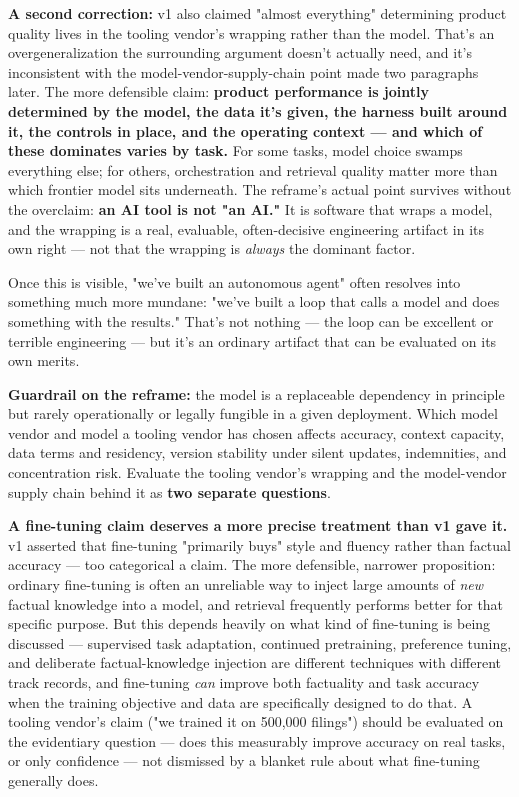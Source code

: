 \textbf{A second correction:} v1 also claimed "almost everything" determining product quality lives in the tooling vendor's wrapping rather than the model. That's an overgeneralization the surrounding argument doesn't actually need, and it's inconsistent with the model-vendor-supply-chain point made two paragraphs later. The more defensible claim: \textbf{product performance is jointly determined by the model, the data it's given, the harness built around it, the controls in place, and the operating context --- and which of these dominates varies by task.} For some tasks, model choice swamps everything else; for others, orchestration and retrieval quality matter more than which frontier model sits underneath. The reframe's actual point survives without the overclaim: \textbf{an AI tool is not "an AI."} It is software that wraps a model, and the wrapping is a real, evaluable, often-decisive engineering artifact in its own right --- not that the wrapping is \emph{always} the dominant factor.

Once this is visible, "we've built an autonomous agent" often resolves into something much more mundane: "we've built a loop that calls a model and does something with the results." That's not nothing --- the loop can be excellent or terrible engineering --- but it's an ordinary artifact that can be evaluated on its own merits.

\textbf{Guardrail on the reframe:} the model is a replaceable dependency in principle but rarely operationally or legally fungible in a given deployment. Which model vendor and model a tooling vendor has chosen affects accuracy, context capacity, data terms and residency, version stability under silent updates, indemnities, and concentration risk. Evaluate the tooling vendor's wrapping and the model-vendor supply chain behind it as \textbf{two separate questions}.

\textbf{A fine-tuning claim deserves a more precise treatment than v1 gave it.} v1 asserted that fine-tuning "primarily buys" style and fluency rather than factual accuracy --- too categorical a claim. The more defensible, narrower proposition: ordinary fine-tuning is often an unreliable way to inject large amounts of \emph{new} factual knowledge into a model, and retrieval frequently performs better for that specific purpose. But this depends heavily on what kind of fine-tuning is being discussed --- supervised task adaptation, continued pretraining, preference tuning, and deliberate factual-knowledge injection are different techniques with different track records, and fine-tuning \emph{can} improve both factuality and task accuracy when the training objective and data are specifically designed to do that. A tooling vendor's claim ("we trained it on 500,000 filings") should be evaluated on the evidentiary question --- does this measurably improve accuracy on real tasks, or only confidence --- not dismissed by a blanket rule about what fine-tuning generally does.
